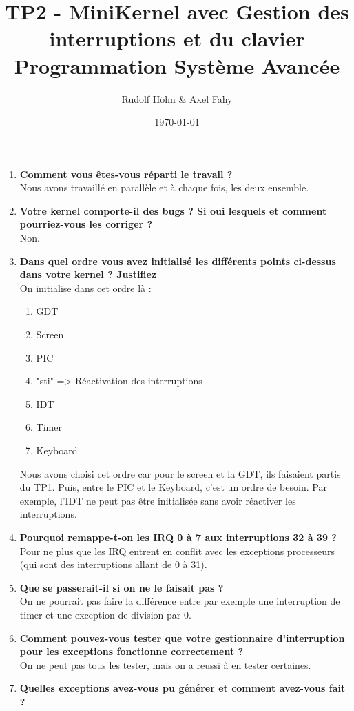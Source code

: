 \documentclass[a4paper]{article}
\title{TP2 - MiniKernel avec Gestion des interruptions et du clavier\\Programmation Système Avancée}
\author{Rudolf Höhn \& Axel Fahy}
\date{\today}
\begin{document}
\maketitle

\begin{enumerate}
\item \textbf{Comment vous êtes-vous réparti le travail ?}\\
Nous avons travaillé en parallèle et à chaque fois, les deux ensemble. 
\item \textbf{Votre kernel comporte-il des bugs ? Si oui lesquels et comment pourriez-vous les corriger ?}\\
Non.
\item \textbf{Dans quel ordre vous avez initialisé les différents points ci-dessus dans votre kernel ? Justifiez}\\
On initialise dans cet ordre là :
\begin{enumerate}
\item GDT
\item Screen
\item PIC
\item "sti" => Réactivation des interruptions
\item IDT
\item Timer
\item Keyboard
\end{enumerate}
Nous avons choisi cet ordre car pour le screen et la GDT, ils faisaient partis du TP1. Puis, entre le PIC et le Keyboard, c'est un ordre de besoin. Par exemple, l'IDT ne peut pas être initialisée sans avoir réactiver les interruptions.
\item \textbf{Pourquoi remappe-t-on les IRQ 0 à 7 aux interruptions 32 à 39 ?}\\
Pour ne plus que les IRQ entrent en conflit avec les exceptions processeurs (qui sont des interruptions allant de 0 à 31).
\item \textbf{Que se passerait-il si on ne le faisait pas ?}\\
On ne pourrait pas faire la différence entre par exemple une interruption de timer et une exception de division par 0.
\item \textbf{Comment pouvez-vous tester que votre gestionnaire d'interruption pour les exceptions fonctionne correctement ?}\\
On ne peut pas tous les tester, mais on a reussi à en tester certaines.
\item \textbf{Quelles exceptions avez-vous pu générer et comment avez-vous fait ?}\\

\end{enumerate}
\end{document}
